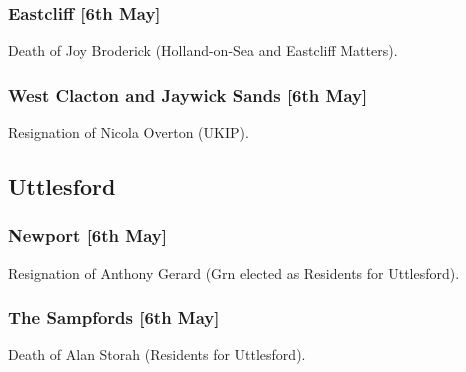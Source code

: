 \documentclass[a4paper,openany]{book}
\begin{document}
\begin{resultsiii}
\subsubsection*{Eastcliff \hspace*{\fill}\nolinebreak[1]%
	\enspace\hspace*{\fill}
	[6th May]}


Death of Joy Broderick (Holland-on-Sea and Eastcliff Matters).

\subsubsection*{West Clacton and Jaywick Sands \hspace*{\fill}\nolinebreak[1]%
	\enspace\hspace*{\fill}
	[6th May]}


Resignation of Nicola Overton (UKIP).

\subsection*{Uttlesford}

\subsubsection*{Newport \hspace*{\fill}\nolinebreak[1]%
	\enspace\hspace*{\fill}
	[6th May]}


Resignation of Anthony Gerard (Grn elected as Residents for Uttlesford).

\subsubsection*{The Sampfords \hspace*{\fill}\nolinebreak[1]%
	\enspace\hspace*{\fill}
	[6th May]}


Death of Alan Storah (Residents for Uttlesford).


\end{resultsiii}
\end{document}
